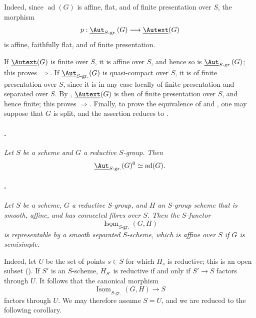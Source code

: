 Indeed, since \(\operatorname{ad}(G)\) is affine, flat, and of finite
presentation over \(S\), the morphism
\[
  p:\underline{\Aut}_{S\text{-}\mathrm{gr.}}(G)
  \longrightarrow\underline{\Autext}(G)
\]
is affine, faithfully flat, and of finite presentation.

If \(\underline{\Autext}(G)\) is finite over \(S\), it is affine over
\(S\), and hence so is
\(\underline{\Aut}_{S\text{-}\mathrm{gr.}}(G)\); this proves
\textup{}\(\Rightarrow\)\textup{}. If
\(\underline{\Aut}_{S\text{-}\mathrm{gr.}}(G)\) is quasi-compact over
\(S\), it is of finite presentation over \(S\), since it is in any
case locally of finite presentation and separated over \(S\). By
, \(\underline{\Autext}(G)\) is then of finite presentation
over \(S\), and hence finite; this proves
\textup{}\(\Rightarrow\)\textup{}. Finally, to prove the
equivalence of \textup{} and \textup{}, one may suppose that
\(G\) is split, and the assertion reduces to .

\paragraph{.}
\emph{Let \(S\) be a scheme and \(G\) a reductive \(S\)-group. Then}
\[
  \underline{\Aut}_{S\text{-}\mathrm{gr.}}(G)^0
  \simeq\operatorname{ad}(G).
\]

\paragraph{.}
\emph{Let \(S\) be a scheme, \(G\) a reductive \(S\)-group, and
\(H\) an \(S\)-group scheme that is smooth, affine, and has connected
fibres over \(S\). Then the \(S\)-functor}
\[
  \underline{\operatorname{Isom}}_{S\text{-}\mathrm{gr.}}(G,H)
\]
\emph{is representable by a smooth separated \(S\)-scheme, which is
affine over \(S\) if \(G\) is semisimple.}

Indeed, let \(U\) be the set of points \(s\in S\) for which \(H_s\)
is reductive; this is an open subset \textup{()}. If
\(S'\) is an \(S\)-scheme, \(H_{S'}\) is reductive if and only if
\(S'\to S\) factors through \(U\). It follows that the canonical
morphism
\[
  \underline{\operatorname{Isom}}_{S\text{-}\mathrm{gr.}}(G,H)
  \longrightarrow S
\]
factors through \(U\). We may therefore assume \(S=U\), and we are
reduced to the following corollary.


